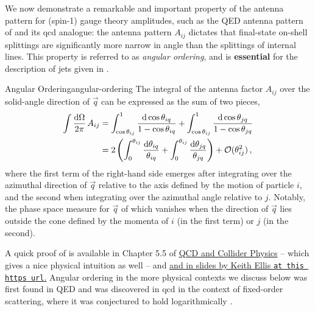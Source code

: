 We now demonstrate a remarkable and important property of the antenna pattern for (spin-1) gauge theory amplitudes, such as the QED antenna pattern of  and its \gls{qcd} analogue:
%
the antenna pattern \(A_{ij}\) dictates that final-state on-shell splittings are significantly more narrow in angle than the splittings of internal lines.
%
This property is referred to as \textit{angular ordering}, and is \textbf{essential} for the description of jets given in .


\begin{lemma}{Angular Ordering}{angular-ordering}
    The integral of the antenna factor \(A_{ij}\) over the solid-angle direction of \(\vec{q}\) can be expressed as the sum of two pieces,
    \begin{align}
        \label{eq:angular-ordering-integral}
        \int \frac{\dd \Omega}{2\pi}\, A_{ij}
        &=
        \int_{\cos\theta_{ij}}^{1}
        \frac{\dd \cos\theta_{iq}}{1-\cos\theta_{iq}}
        +
        \int_{\cos\theta_{ij}}^{1}
        \frac{\dd \cos\theta_{jq}}{1-\cos\theta_{jq}}
        \\
        &=
        2
        \le(
            \int_{0}^{\theta_{ij}}
            \frac{\dd \theta_{iq}}{\theta_{iq}}
            +
            \int_{0}^{\theta_{ij}}
            \frac{\dd \theta_{jq}}{\theta_{jq}}
        \ri)
        +
        \mathcal{O}(\theta_{ij}^2)
        \,,
    \end{align}
    where the first term of the right-hand side emerges after integrating over the azimuthal direction of \(\vec{q}\) relative to the axis defined by the motion of particle \(i\), and the second when integrating over the azimuthal angle relative to \(j\).
    Notably, the phase space measure for \(\vec{q}\) of which vanishes when the direction of \(\vec{q}\) lies outside the cone defined by the momenta of \(i\) (in the first term) or \(j\) (in the second).
\end{lemma}

A quick proof of  is available in Chapter 5.5 of \underline{QCD and Collider Physics} \cite{Ellis:1996mzs} -- which gives a nice physical intuition as well -- and \href{https://indico.ictp.it/event/a12185/session/36/contribution/26/material/0/0.pdf\#page=34}{and in slides by Keith Ellis \texttt{at this https url}.}
%
Angular ordering in the more physical contexts we discuss below was first found in QED \cite{osti_4367332} and was discovered in \gls{qcd} in the context of fixed-order scattering, where it was conjectured to hold logarithmically \cite{Mueller:1981ex}.


